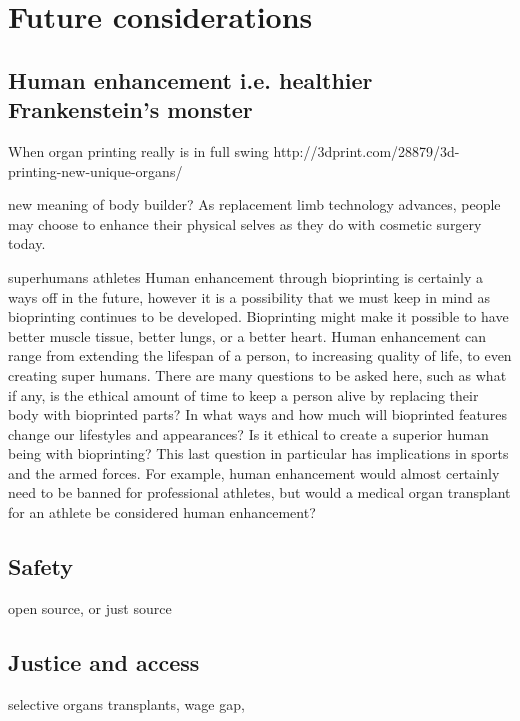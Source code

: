 \documentclass[12pt]{article} %
\begin{document}
\section{Future considerations} %

\subsection{Human enhancement i.e. healthier Frankenstein's monster} %
When organ printing really is in full swing
http://3dprint.com/28879/3d-printing-new-unique-organs/

new meaning of body builder?
As replacement limb technology advances, people may choose to enhance their physical selves as they do with cosmetic surgery today.

superhumans
athletes
Human enhancement through bioprinting is certainly a ways off in the future, however it is a possibility that we must keep in mind as bioprinting continues to be developed. Bioprinting might make it possible to have better muscle tissue, better lungs, or a better heart. Human enhancement can range from extending the lifespan of a person, to increasing quality of life, to even creating super humans. There are many questions to be asked here, such as what if any, is the ethical amount of time to keep a person alive by replacing their body with bioprinted parts? In what ways and how much will bioprinted features change our lifestyles and appearances? Is it ethical to create a superior human being with bioprinting? This last question in particular has implications in sports and the armed forces. For example, human enhancement would almost certainly need to be banned for professional athletes, but would a medical organ transplant for an athlete be considered human enhancement?




\subsection{Safety} %
open source, or just source


\subsection{Justice and access} %
selective organs transplants,
wage gap,
\end{document}
